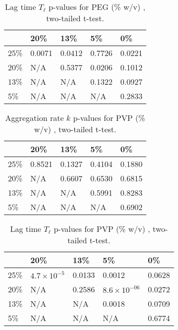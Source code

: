 \begin{table}[b!]
  \caption[Lag time p-values for PEG.]{Lag time $T_\ell$ p-values for PEG (\% w/v) , two-tailed t-test.}
    \label{table:p-tl-values-peg}
    \begin{tabular}{p{2cm}|p{3cm}p{3cm}p{3cm}p{3cm}}
        &20\% &  13\% & 5\% & 0\% \\ \hline
	25\% & 0.0071 & 0.0412 & 0.7726 &0.0221\\
	20\% & N/A &0.5377 &  0.0206 & 0.1012\\
     	13\% & N/A  & N/A & 0.1322 & 0.0927\\
      	5\% & N/A & N/A  & N/A &0.2833\\
    \end{tabular}
\end{table}

\begin{table}[b!]
  \caption[Aggregation rate p-values for PVP.]{Aggregation rate $k$ p-values for PVP (\% w/v) , two-tailed t-test.}
    \label{table:p-k-values-peg}
    \begin{tabular}{p{2cm}|p{3cm}p{3cm}p{3cm}p{3cm}}
        &20\% &  13\% & 5\% & 0\% \\ \hline
	25\% & 0.8521 & 0.1327 & 0.4104 &0.1880\\
	20\% & N/A &0.6607 & 0.6530 & 0.6815\\
     	13\% & N/A  & N/A & 0.5991 & 0.8283\\
      	5\% & N/A & N/A  & N/A & 0.6902\\
    \end{tabular}
\end{table}

\begin{table}[b!]
  \caption[Lag time p-values for PVP.]{Lag time $T_\ell$ p-values for PVP (\% w/v) , two-tailed t-test.}
    \label{table:p-tl-values-pvp}
    \begin{tabular}{p{2cm}|p{3cm}p{3cm}p{3cm}p{3cm}}
        &20\% &  13\% & 5\% & 0\% \\ \hline
	25\% & $4.7\times 10^{-5}$ & 0.0133 & 0.0012 &0.0628\\
	20\% & N/A &0.2586 &  $8.6\times 10^{-06}$ & 0.0272\\
     	13\% & N/A  & N/A & 0.0018 & 0.0709\\
      	5\% & N/A & N/A  & N/A &0.6774\\
    \end{tabular}
\end{table}